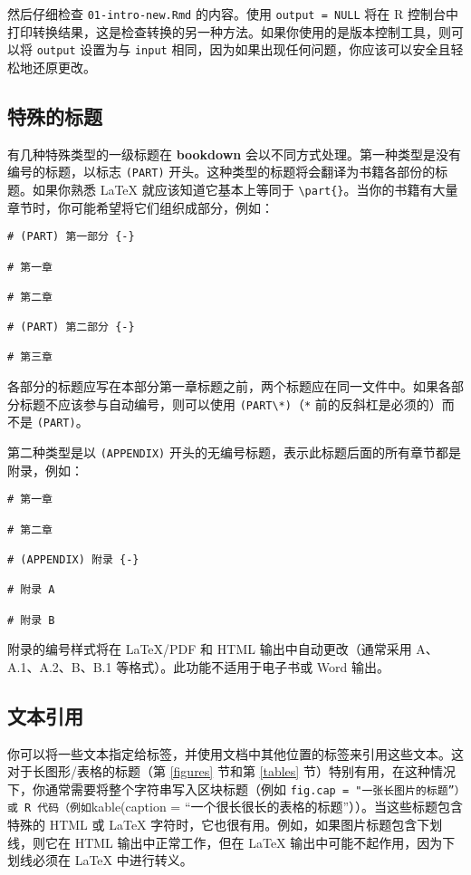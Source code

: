 \documentclass[
  12pt,
]{krantz}
\theoremstyle{definition}
\theoremstyle{definition}
\theoremstyle{definition}
\theoremstyle{definition}
\theoremstyle{remark}
\begin{document}
然后仔细检查 \texttt{01-intro-new.Rmd} 的内容。使用 \texttt{output\ =\ NULL} 将在 R 控制台中打印转换结果，这是检查转换的另一种方法。如果你使用的是版本控制工具，则可以将 \texttt{output} 设置为与 \texttt{input} 相同，因为如果出现任何问题，你应该可以安全且轻松地还原更改。

\subsection{特殊的标题}\label{ux7279ux6b8aux7684ux6807ux9898}

有几种特殊类型的一级标题在 \textbf{bookdown} 会以不同方式处理。第一种类型是没有编号的标题，以标志 \texttt{(PART)} 开头。这种类型的标题将会翻译为书籍各部份的标题。如果你熟悉 LaTeX 就应该知道它基本上等同于 \texttt{\textbackslash{}part\{\}}。当你的书籍有大量章节时，你可能希望将它们组织成部分，例如：

\begin{verbatim}
# (PART) 第一部分 {-} 

# 第一章

# 第二章

# (PART) 第二部分 {-} 

# 第三章
\end{verbatim}

各部分的标题应写在本部分第一章标题之前，两个标题应在同一文件中。如果各部分标题不应该参与自动编号，则可以使用 \texttt{(PART\textbackslash{}*)}（\texttt{*} 前的反斜杠是必须的）而不是 \texttt{(PART)}。

第二种类型是以 \texttt{(APPENDIX)} 开头的无编号标题，表示此标题后面的所有章节都是附录，例如：

\begin{verbatim}
# 第一章

# 第二章

# (APPENDIX) 附录 {-} 

# 附录 A

# 附录 B
\end{verbatim}

附录的编号样式将在 LaTeX/PDF 和 HTML 输出中自动更改（通常采用 A、A.1、A.2、B、B.1 等格式）。此功能不适用于电子书或 Word 输出。

\subsection{文本引用}\label{text-references}

你可以将一些文本指定给标签，并使用文档中其他位置的标签来引用这些文本。这对于长图形/表格的标题（第 \ref{figures} 节和第 \ref{tables} 节）特别有用，在这种情况下，你通常需要将整个字符串写入区块标题（例如 \texttt{fig.cap\ =\ "一张长图片的标题”）或\ R\ 代码（例如}kable(caption = ``一个很长很长的表格的标题''））。当这些标题包含特殊的 HTML 或 LaTeX 字符时，它也很有用。例如，如果图片标题包含下划线，则它在 HTML 输出中正常工作，但在 LaTeX 输出中可能不起作用，因为下划线必须在 LaTeX 中进行转义。
\end{document}
